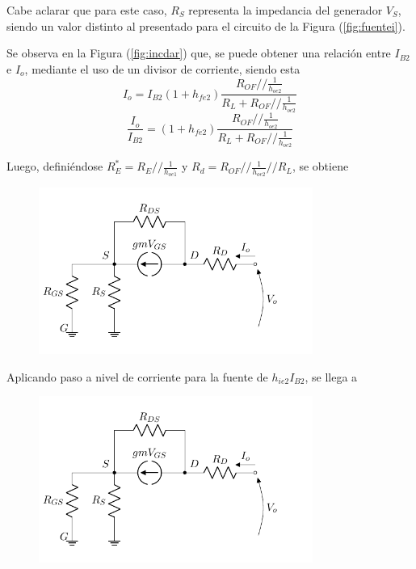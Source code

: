 Cabe aclarar que para este caso, $R_S$ representa la impedancia del generador $V_S$, siendo un valor distinto al presentado para el circuito de la Figura (\ref{fig:fuentei}).

Se observa en la Figura (\ref{fig:incdar}) que, se puede obtener una relación entre $I_{B2}$ e $I_o$, mediante el uso de un divisor de corriente, siendo esta
\begin{equation*}
	I_o = I_{B2} \left( 1 + h_{fe2} \right) \frac{R_{OF} // \frac{1}{h_{oe2}}}{R_L + R_{OF} // \frac{1}{h_{oe2}}}
\end{equation*}
\begin{equation}
	\frac{I_o}{I_{B2}} = \left( 1 + h_{fe2} \right) \frac{R_{OF} // \frac{1}{h_{oe2}}}{R_L + R_{OF} // \frac{1}{h_{oe2}}}
	\label{equ:io-ib2}
\end{equation}

Luego, definiéndose $R_{E}^* = R_{E} // \frac{1}{h_{oe1}}$ y $R_d = R_{OF} // \frac{1}{h_{oe2}} // R_L$, se obtiene
\begin{figure}[H]
\centering
	\includegraphics[width=0.8\textwidth, page=4]{Imagenes/ModeloIncremental.pdf}
\end{figure}

Aplicando paso a nivel de corriente para la fuente de $h_{ie2} I_{B2}$, se llega a
\begin{figure}[H]
\centering
	\includegraphics[width=0.8\textwidth, page=5]{Imagenes/ModeloIncremental.pdf}
\end{figure}

